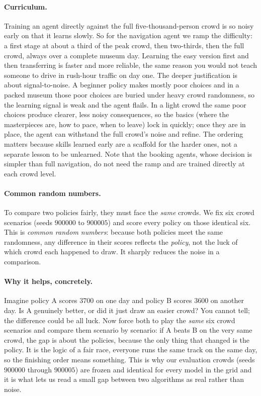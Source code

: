 \documentclass[11pt]{article}
\newcommand{\key}[1]{\textit{#1}}            %
\begin{document}
\paragraph{Curriculum.} Training an agent directly against the full five-thousand-person
crowd is so noisy early on that it learns slowly. So for the navigation agent we ramp the
difficulty: a first stage at about a third of the peak crowd, then two-thirds, then the
full crowd, always over a complete museum day. Learning the easy version first and then
transferring is faster and more reliable, the same reason you would not teach someone to
drive in rush-hour traffic on day one. The deeper justification is about signal-to-noise. A
beginner policy makes mostly poor choices and in a packed museum those poor choices are
buried under heavy crowd randomness, so the learning signal is weak and the agent flails.
In a light crowd the same poor choices produce clearer, less noisy consequences, so the
basics (where the masterpieces are, how to pace, when to leave) lock in quickly; once they
are in place, the agent can withstand the full crowd's noise and refine. The ordering
matters because skills learned early are a scaffold for the harder ones, not a separate
lesson to be unlearned. Note that the booking agents, whose decision is simpler than full
navigation, do not need the ramp and are trained directly at each crowd level.

\paragraph{Common random numbers.} To compare two policies fairly, they must face the
\emph{same} crowds. We fix six crowd scenarios (seeds $900000$ to $900005$) and score every
policy on those identical six. This is \key{common random numbers}: because both policies
meet the same randomness, any difference in their scores reflects the \key{policy}, not the
luck of which crowd each happened to draw. It sharply reduces the noise in a comparison.

\paragraph{Why it helps, concretely.} Imagine policy A scores $3700$ on one day and policy B
scores $3600$ on another day. Is A genuinely better, or did it just draw an easier crowd? You
cannot tell; the difference could be all luck. Now force both to play the \emph{same} six
crowd scenarios and compare them scenario by scenario: if A beats B on the very same crowd,
the gap is about the policies, because the only thing that changed is the policy. It is the
logic of a fair race, everyone runs the same track on the same day, so the finishing order
means something. This is why our evaluation crowds (seeds $900000$ through $900005$) are
frozen and identical for every model in the grid and it is what lets us read a small gap
between two algorithms as real rather than noise.
\end{document}
